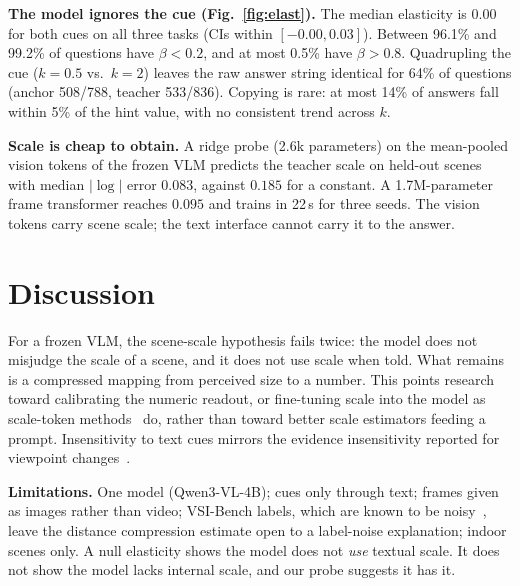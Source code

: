 \documentclass[10pt,twocolumn,letterpaper]{article}
\begin{document}
\textbf{The model ignores the cue (Fig.~\ref{fig:elast}).} The median elasticity is $0.00$ for both cues on all three tasks
(CIs within $[-0.00, 0.03]$). Between 96.1\% and 99.2\% of questions have $\beta<0.2$, and at most 0.5\% have $\beta>0.8$.
Quadrupling the cue ($k{=}0.5$ vs.\ $k{=}2$) leaves the raw answer string identical for 64\% of questions
(anchor 508/788, teacher 533/836). Copying is rare: at most 14\% of answers fall within 5\% of the hint value,
with no consistent trend across $k$.

\textbf{Scale is cheap to obtain.} A ridge probe (2.6k parameters) on the mean-pooled vision tokens of
the frozen VLM predicts the teacher scale on held-out scenes with median $|\log|$ error $0.083$, against
$0.185$ for a constant. A 1.7M-parameter frame transformer reaches $0.095$ and trains in 22\,s for three seeds.
The vision tokens carry scene scale; the text interface cannot carry it to the answer.

\section{Discussion}
For a frozen VLM, the scene-scale hypothesis fails twice: the model does not misjudge the scale of a scene,
and it does not use scale when told. What remains is a compressed mapping from perceived size to a number. This points
research toward calibrating the numeric readout, or fine-tuning scale into the model as scale-token
methods~\cite{robotracer} do, rather than toward better scale estimators feeding a prompt.
Insensitivity to text cues mirrors the evidence insensitivity reported for viewpoint changes~\cite{consistentyetwrong}.

\textbf{Limitations.} One model (Qwen3-VL-4B); cues only through text; frames given as images rather than video;
VSI-Bench labels, which are known to be noisy~\cite{revsi}, leave the distance compression estimate open to a label-noise
explanation; indoor scenes only. A null elasticity shows the model does not \emph{use} textual scale. It does not
show the model lacks internal scale, and our probe suggests it has it.



\end{document}
